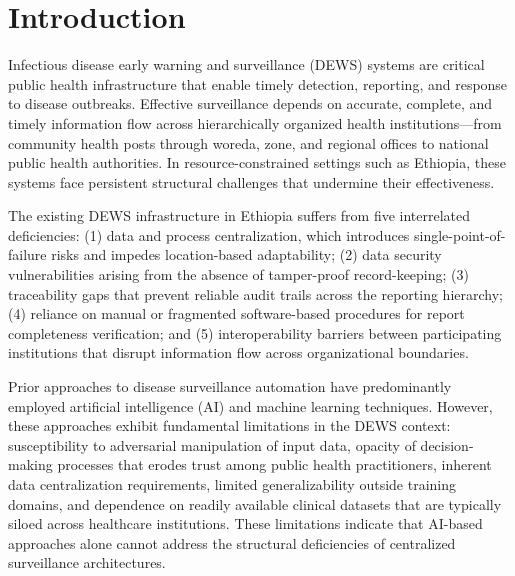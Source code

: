 \documentclass[AMA,LATO1COL]{WileyNJD-v2}
\begin{document}

\jnlcitation{\cmark[Authors]}

\maketitle

\section{Introduction}\label{sec:introduction}

Infectious disease early warning and surveillance (DEWS) systems are critical public health infrastructure that enable timely detection, reporting, and response to disease outbreaks. Effective surveillance depends on accurate, complete, and timely information flow across hierarchically organized health institutions---from community health posts through woreda, zone, and regional offices to national public health authorities. In resource-constrained settings such as Ethiopia, these systems face persistent structural challenges that undermine their effectiveness.

The existing DEWS infrastructure in Ethiopia suffers from five interrelated deficiencies: (1) data and process centralization, which introduces single-point-of-failure risks and impedes location-based adaptability; (2) data security vulnerabilities arising from the absence of tamper-proof record-keeping; (3) traceability gaps that prevent reliable audit trails across the reporting hierarchy; (4) reliance on manual or fragmented software-based procedures for report completeness verification; and (5) interoperability barriers between participating institutions that disrupt information flow across organizational boundaries.

Prior approaches to disease surveillance automation have predominantly employed artificial intelligence (AI) and machine learning techniques. However, these approaches exhibit fundamental limitations in the DEWS context: susceptibility to adversarial manipulation of input data,\cite{finlayson2019adversarial} opacity of decision-making processes that erodes trust among public health practitioners,\cite{core2012building} inherent data centralization requirements,\cite{kelly2019key} limited generalizability outside training domains,\cite{kelly2019key} and dependence on readily available clinical datasets that are typically siloed across healthcare institutions.\cite{kelly2019key} These limitations indicate that AI-based approaches alone cannot address the structural deficiencies of centralized surveillance architectures.
\end{document}
